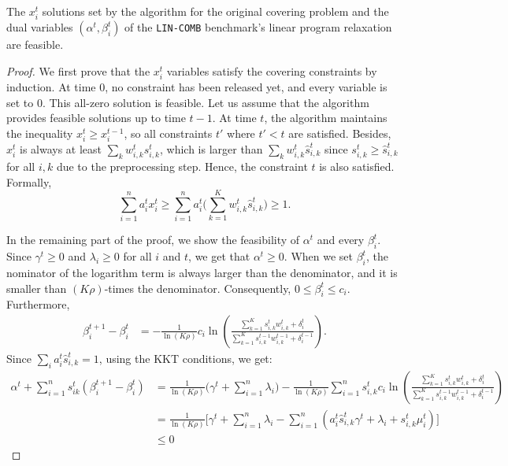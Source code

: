 \begin{lemma} \label{lem:covering-feasibility}
The $x_{i}^{t}$ solutions set by the algorithm for the original covering problem and the dual variables $(\alpha^{t}, \beta_{i}^{t})$ of the \texttt{LIN-COMB} benchmark's linear program relaxation are feasible.
\end{lemma}
%
\begin{proof}
We first prove that the $x_{i}^{t}$ variables satisfy the covering constraints by induction. At time 0, no constraint has been released yet, and every variable is set to 0. This all-zero solution is feasible. Let us assume that the algorithm provides feasible solutions up to time $t-1$. At time $t$, the algorithm maintains the inequality $x_{i}^{t} \geq x_{i}^{t-1}$, so all constraints $t'$ where $t' < t$ are satisfied. Besides, $x_{i}^{t}$ is always at least
$\sum_{k} w_{i,k}^{t} s_{i,k}^{t}$, which is larger than $\sum_{k} w_{i,k}^{t} \hat{s}_{i,k}^{t}$ since $s_{i,k}^{t} \geq \hat{s}_{i,k}^{t}$
for all $i,k$ due to the preprocessing step. Hence, the constraint $t$ is also satisfied. Formally,
$$
\sum_{i=1}^{n} a_{i}^{t} x_{i}^{t}  \geq \sum_{i=1}^{n} a_{i}^{t} \biggl( \sum_{k=1}^{K} w_{i,k}^{t}  \hat{s}_{i,k}^{t} \biggr) \geq 1.
$$

In the remaining part of the proof, we show the feasibility of $\alpha^{t}$ and every $\beta_{i}^{t}$.
Since $ \gamma^{t} \geq 0$ and $\lambda_{i} \geq 0$ for all $i$ and $t$, we get that $\alpha^{t} \geq 0$.
When we set $\beta_{i}^{t}$, the nominator of the logarithm term is always larger than the denominator, and it is smaller than $(K\rho)$-times the denominator. Consequently, $0 \leq \beta_{i}^{t} \leq c_{i}$. Furthermore,
%
\begin{align*}
    \beta_{i}^{t+1} - \beta_{i}^{t}
    	&= - \frac{1}{\ln(K\rho)} c_i \ln \left( \frac{\sum_{k=1}^{K}  s_{i,k}^{t} w_{i,k}^{t} + \delta_{i}^{t}}{\sum_{k=1}^{K}  s_{i,k}^{t-1}w_{i,k}^{t-1} + \delta_{i}^{t-1}} \right).
\end{align*}
%
Since $\sum_{i} a_{i}^{t} \hat{s}_{i,k}^{t} = 1$, using the KKT conditions, we get:
\begin{align*}
\alpha^{t} + \sum_{i=1}^{n} s_{ik}^{t} \left(\beta_{i}^{t+1} - \beta_{i}^{t}\right)
&= \frac{1}{\ln(K\rho)} \biggl( \gamma^{t} + \sum_{i=1}^{n} \lambda_{i} \biggr)
	- \frac{1}{\ln(K\rho)}  \sum_{i=1}^{n} s_{i,k}^{t} c_i \ln \left( \frac{\sum_{k=1}^{K}  s_{i,k}^{t} w_{i,k}^{t} + \delta_{i}^{t}}{\sum_{k=1}^{K}  s_{i,k}^{t-1}w_{i,k}^{t-1} + \delta_{i}^{t-1}} \right) \\
%
&= \frac{1}{\ln(K\rho)} \biggl[ \gamma^{t} + \sum_{i=1}^{n} \lambda_{i} - \sum_{i=1}^{n} \left( a_{i}^{t} \hat{s}_{i,k}^{t} \gamma^{t} + \lambda_{i} + s_{i,k}^{t} \mu_{i}^{t} \right) \biggr] \\
%
&\leq 0
\end{align*}
\end{proof}

